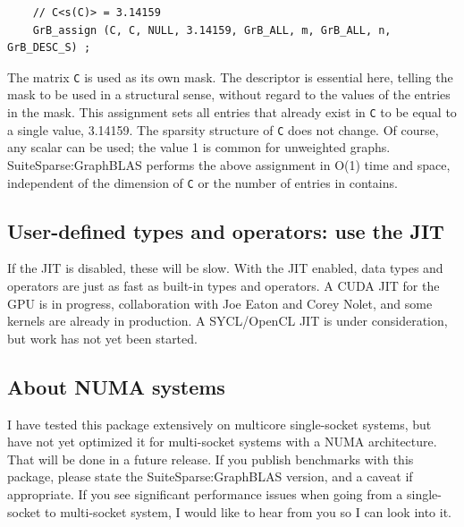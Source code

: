     {\footnotesize
    \begin{verbatim}
    // C<s(C)> = 3.14159
    GrB_assign (C, C, NULL, 3.14159, GrB_ALL, m, GrB_ALL, n, GrB_DESC_S) ; \end{verbatim}}

The matrix \verb'C' is used as its own mask.  The descriptor is essential here,
telling the mask to be used in a structural sense, without regard to the values
of the entries in the mask.  This assignment sets all entries that already
exist in \verb'C' to be equal to a single value, 3.14159. The sparsity
structure of \verb'C' does not change.  Of course, any scalar can be used; the
value 1 is common for unweighted graphs.  SuiteSparse:GraphBLAS performs the
above assignment in O(1) time and space, independent of the dimension of
\verb'C' or the number of entries in contains.

\subsection{User-defined types and operators: use the JIT}

If the JIT is disabled, these will be slow.  With the JIT enabled, data types
and operators are just as fast as built-in types and operators.  A CUDA JIT for
the GPU is in progress, collaboration with Joe Eaton and Corey Nolet,
and some kernels are already in production.
A SYCL/OpenCL JIT is under consideration, but work has not yet been started.

\subsection{About NUMA systems}

I have tested this package extensively on multicore single-socket systems, but
have not yet optimized it for multi-socket systems with a NUMA architecture.
That will be done in a future release.  If you publish benchmarks
with this package, please state the SuiteSparse:GraphBLAS version, and a caveat
if appropriate.  If you see significant performance issues when going from a
single-socket to multi-socket system, I would like to hear from you so I can
look into it.

